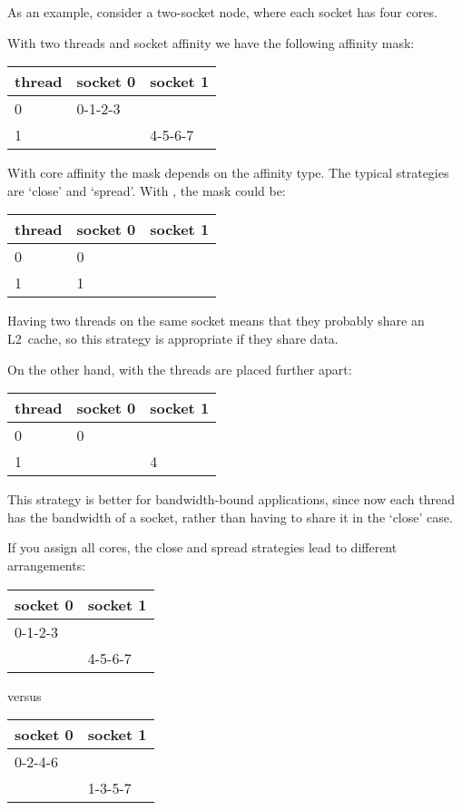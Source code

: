 As an example, consider a two-socket node, where each socket has four
cores.

With two threads and socket affinity we have the following affinity mask:\\
\begin{tabular}{|l|l|l|}
  \hline
  thread & socket 0 & socket 1\\
  \hline \hline
  0 & 0-1-2-3 & \\
  1 & & 4-5-6-7 \\
  \hline
\end{tabular}

With core affinity the mask depends on the affinity type. The typical
strategies are `close' and `spread'. With , the mask
could be:\\
\begin{tabular}{|l|l|l|}
  \hline
  thread & socket 0 & socket 1\\
  \hline \hline
  0 & 0 & \\
  1 & \hphantom{0-}1 & \\
  \hline
\end{tabular}

Having two threads on the same socket means that they probably share
an L2~cache, so this strategy is appropriate if they share data.

On the other hand, with  the threads
are placed further apart:\\
\begin{tabular}{|l|l|l|}
  \hline
  thread & socket 0 & socket 1\\
  \hline \hline
  0 & 0 & \\
  1 & & 4 \\
  \hline
\end{tabular}

This strategy is better for bandwidth-bound applications, since now
each thread has the bandwidth of a socket, rather than having to share
it in the `close' case.

If you assign all cores, the close and spread strategies lead to
different arrangements:\\
\begin{tabular}{|l|l|}
  \hline
  socket 0 & socket 1\\
  \hline \hline
  0-1-2-3 & \\
  & 4-5-6-7\\
  \hline
\end{tabular}

versus\\
\begin{tabular}{|l|l|}
  \hline
  socket 0 & socket 1\\
  \hline \hline
  0-2-4-6 & \\
  & 1-3-5-7 \\
  \hline
\end{tabular}

